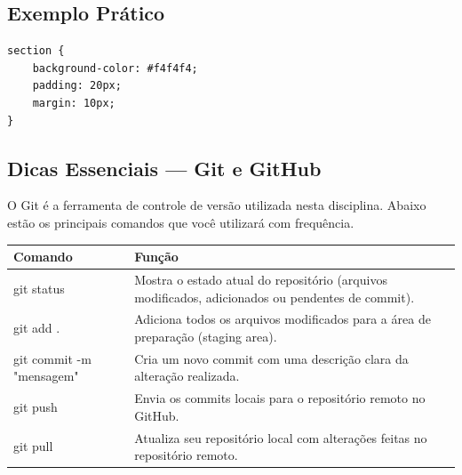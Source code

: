 \documentclass[12pt,a4paper]{article}
\begin{document}
\subsection*{Exemplo Prático}

\begin{boxCodigo}
\begin{verbatim}
section {
    background-color: #f4f4f4;
    padding: 20px;
    margin: 10px;
}
\end{verbatim}
\end{boxCodigo}


\newpage

\subsection{Dicas Essenciais — Git e GitHub}

O Git é a ferramenta de controle de versão utilizada nesta disciplina.  
Abaixo estão os principais comandos que você utilizará com frequência.

\begin{boxTabela}
\begin{tabular}{|p{4cm}|p{12cm}|}
\hline
\rowcolor{pretoTabela}
\color{white}\textbf{Comando} &
\color{white}\textbf{Função} \\
\hline

git status &
Mostra o estado atual do repositório (arquivos modificados, adicionados ou pendentes de commit). \\
\hline

git add . &
Adiciona todos os arquivos modificados para a área de preparação (staging area). \\
\hline

git commit -m "mensagem" &
Cria um novo commit com uma descrição clara da alteração realizada. \\
\hline

git push &
Envia os commits locais para o repositório remoto no GitHub. \\
\hline

git pull &
Atualiza seu repositório local com alterações feitas no repositório remoto. \\
\hline

\end{tabular}
\end{boxTabela}
\end{document}

